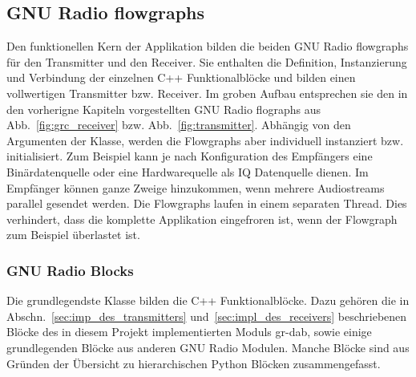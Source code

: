 \subsection{GNU Radio flowgraphs}
Den funktionellen Kern der Applikation bilden die beiden GNU Radio flowgraphs für den Transmitter und den Receiver. Sie enthalten die Definition, Instanzierung und Verbindung der einzelnen C++ Funktionalblöcke und bilden einen vollwertigen Transmitter bzw. Receiver. Im groben Aufbau entsprechen sie den in den vorherigne Kapiteln vorgestellten GNU Radio flographs aus Abb.~\ref{fig:grc_receiver} bzw. Abb.~\ref{fig:transmitter}. Abhängig von den Argumenten der Klasse, werden die Flowgraphs aber individuell instanziert bzw. initialisiert. Zum Beispiel kann je nach Konfiguration des Empfängers eine Binärdatenquelle oder eine Hardwarequelle als IQ Datenquelle dienen. Im Empfänger können ganze Zweige hinzukommen, wenn mehrere Audiostreams parallel gesendet werden.
Die Flowgraphs laufen in einem separaten Thread. Dies verhindert, dass die komplette Applikation eingefroren ist, wenn der Flowgraph zum Beispiel überlastet ist.

\subsubsection{GNU Radio Blocks}
Die grundlegendste Klasse bilden die C++ Funktionalblöcke. Dazu gehören die in Abschn.~\ref{sec:imp_des_transmitters} und~\ref{sec:impl_des_receivers} beschriebenen Blöcke des in diesem Projekt implementierten Moduls gr-dab, sowie einige grundlegenden Blöcke aus anderen GNU Radio Modulen. Manche Blöcke sind aus Gründen der Übersicht zu hierarchischen Python Blöcken zusammengefasst.



